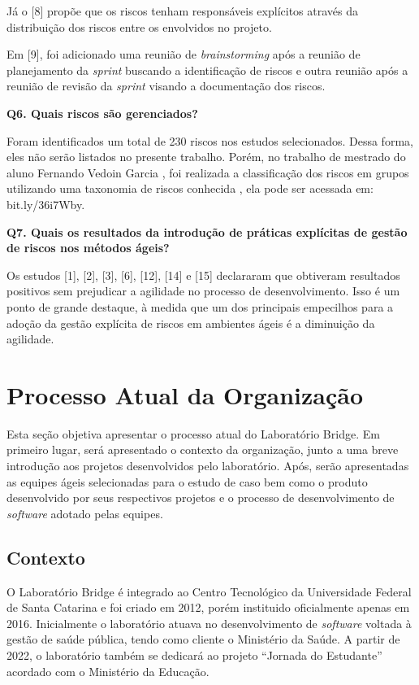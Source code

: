 \documentclass[
    12pt,       %
    openright,      %
    twoside,      %
    a4paper,      %
    english,      %
    french,       %
    spanish,      %
    brazil,       %
    ]{abntex2}
\begin{document}
Já o [8] propõe que os riscos tenham responsáveis explícitos através da distribuição dos riscos entre os envolvidos no projeto. 

Em [9], foi adicionado uma reunião de \textit{brainstorming} após a reunião de planejamento da \textit{sprint} buscando a identificação de riscos e outra reunião após a reunião de revisão da \textit{sprint} visando a documentação dos riscos.

\textbf{Q6. Quais riscos são gerenciados?}

Foram identificados um total de 230 riscos nos estudos selecionados. Dessa forma, eles não serão listados no presente trabalho. Porém, no trabalho de mestrado do aluno Fernando Vedoin Garcia \cite{GARCIA:2021}, foi realizada a classificação dos riscos em grupos utilizando uma taxonomia de riscos conhecida \cite{CARR:1993} \cite{Sundararajan:2019} \cite{Abdulaali:2018}, ela pode ser acessada em: bit.ly/36i7Wby.

\textbf{Q7. Quais os resultados da introdução de práticas explícitas de gestão de riscos nos métodos ágeis?}

Os estudos [1], [2], [3], [6], [12], [14] e [15] declararam que obtiveram resultados positivos sem prejudicar a agilidade no processo de desenvolvimento. Isso é um ponto de grande destaque, à medida que um dos principais empecilhos para a adoção da gestão explícita de riscos em ambientes ágeis é a diminuição da agilidade.

\chapter{Processo Atual da Organização}

Esta seção objetiva apresentar o processo atual do Laboratório Bridge. Em primeiro lugar, será apresentado o contexto da organização, junto a uma breve introdução aos projetos desenvolvidos pelo laboratório. Após, serão apresentadas as equipes ágeis selecionadas para o estudo de caso bem como o produto desenvolvido por seus respectivos projetos e o processo de desenvolvimento de \textit{software} adotado pelas equipes.

\label{sec:Processo}
\section{Contexto}

O Laboratório Bridge é integrado ao Centro Tecnológico da Universidade Federal de Santa Catarina e foi criado em 2012, porém instituido oficialmente apenas em 2016. Inicialmente o laboratório atuava no desenvolvimento de \textit{software} voltada à gestão de saúde pública, tendo como cliente o Ministério da Saúde. A partir de 2022, o laboratório também se dedicará ao projeto ``Jornada do Estudante'' acordado com o Ministério da Educação.
\end{document}
